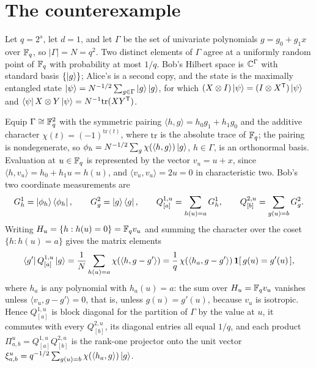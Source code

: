 \documentclass[11pt]{article}
\begin{document}
\section{The counterexample}

Let $q = 2^s$, let $d = 1$, and let $\Gamma$ be the set of univariate
polynomials $g = g_0 + g_1 x$ over $\mathbb{F}_q$, so $|\Gamma| = N = q^2$.  Two
distinct elements of $\Gamma$ agree at a uniformly random point of $\mathbb{F}_q$
with probability at most $1/q$.  Bob's Hilbert space is $\mathbb{C}^{\Gamma}$ with
standard basis $\{\ket{g}\}$; Alice's is a second copy, and the state is
the maximally entangled state
$\ket{\psi} = N^{-1/2} \sum_{g \in \Gamma} \ket{g}\ket{g}$, for which
$(X \otimes I)\ket{\psi} = (I \otimes X^{\mathsf T})\ket{\psi}$ and
$\bra{\psi} X \otimes Y \ket{\psi} = N^{-1}\mathrm{tr}(X Y^{\mathsf T})$.

Equip $\Gamma \cong \mathbb{F}_q^2$ with the symmetric pairing
$\langle h, g\rangle = h_0 g_1 + h_1 g_0$ and the additive character
$\chi(t) = (-1)^{\mathrm{tr}(t)}$, where $\mathrm{tr}$ is the absolute
trace of $\mathbb{F}_q$; the pairing is nondegenerate, so
$\phi_h = N^{-1/2} \sum_{g} \chi(\langle h, g\rangle)\ket{g}$, $h \in \Gamma$,
is an orthonormal basis.  Evaluation at $u \in \mathbb{F}_q$ is represented by the
vector $v_u = u + x$, since $\langle h, v_u\rangle = h_0 + h_1 u = h(u)$, and
$\langle v_u, v_u\rangle = 2u = 0$ in characteristic two.  Bob's two
coordinate measurements are
\[
  G^{1}_h = \ket{\phi_h}\bra{\phi_h},
  \qquad
  G^{2}_g = \ket{g}\bra{g},
  \qquad
  Q^{1,u}_{[a]} = \sum_{h(u) = a} G^1_h,
  \qquad
  Q^{2,u}_{[b]} = \sum_{g(u) = b} G^2_g .
\]
Writing $H_u = \{h : h(u) = 0\} = \mathbb{F}_q v_u$ and summing the character over
the coset $\{h : h(u) = a\}$ gives the matrix elements
\[
  \bra{g'} Q^{1,u}_{[a]} \ket{g}
    = \frac1N \sum_{h(u) = a} \chi(\langle h, g - g'\rangle)
    = \frac{1}{q}\, \chi(\langle h_a, g - g'\rangle)\,
      \mathbf 1[\,g(u) = g'(u)\,],
\]
where $h_a$ is any polynomial with $h_a(u) = a$: the sum over
$H_u = \mathbb{F}_q v_u$ vanishes unless $\langle v_u, g - g'\rangle = 0$, that is,
unless $g(u) = g'(u)$, because $v_u$ is isotropic.  Hence $Q^{1,u}_{[a]}$
is block diagonal for the partition of $\Gamma$ by the value at $u$, it
commutes with every $Q^{2,u}_{[b]}$, its diagonal entries all equal $1/q$,
and each product $\Pi^u_{a,b} = Q^{1,u}_{[a]} Q^{2,u}_{[b]}$ is the rank-one
projector onto the unit vector
$\xi^u_{a,b} = q^{-1/2} \sum_{g(u) = b} \chi(\langle h_a, g\rangle)\ket{g}$.
\end{document}
